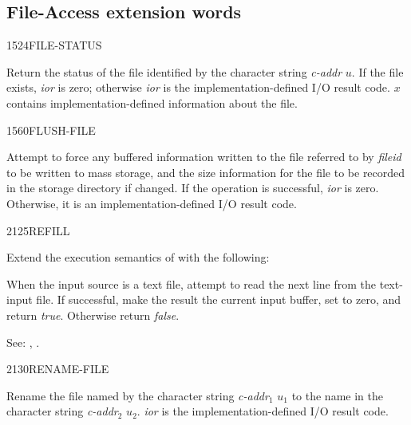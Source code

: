 \subsection{File-Access extension words} %
\extended

\begin{newword}{1524}{FILE-STATUS}

	Return the status of the file identified by the character string
	\emph{c-addr} $u$. If the file exists, \emph{ior} is zero;
	otherwise \emph{ior} is the implementation-defined I/O result
	code. $x$ contains implementation-defined information about the
	file.
\end{newword}


\begin{newword}{1560}{FLUSH-FILE}

	Attempt to force any buffered information written to the file
	referred to by \emph{fileid} to be written to mass storage, and
	the size information for the file to be recorded in the storage
	directory if changed. If the operation is successful, \emph{ior}
	is zero. Otherwise, it is an implementation-defined I/O result
	code.
\end{newword}


\begin{newword}{2125}{REFILL}

	Extend the execution semantics of 
	with the following:

	When the input source is a text file, attempt to read the next
	line from the text-input file. If successful, make the result
	the current input buffer, set  to zero, and
	return \emph{true}. Otherwise return \emph{false}.

\item[See:]	
	,
	.
\end{newword}


\begin{newword}{2130}{RENAME-FILE}

	Rename the file named by the character string \emph{c-addr}$_1$
	$u_1$ to the name in the character string \emph{c-addr}$_2$
	$u_2$. \emph{ior} is the implementation-defined I/O result code.
\end{newword}
